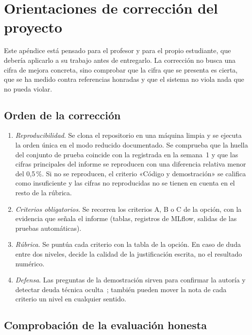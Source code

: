 \chapter{Orientaciones de corrección del proyecto}
\label{ap:correccion}

Este apéndice está pensado para el profesor y para el propio estudiante, que debería aplicarlo a su trabajo antes de entregarlo. La corrección no busca una cifra de mejora concreta, sino comprobar que la cifra que se presenta es cierta, que se ha medido contra referencias honradas y que el sistema no viola nada que no pueda violar.

\section{Orden de la corrección}

\begin{enumerate}[label=\arabic*.]
  \item \emph{Reproducibilidad}. Se clona el repositorio en una máquina limpia y se ejecuta la orden única en el modo reducido documentado. Se comprueba que la huella del conjunto de prueba coincide con la registrada en la semana~1 y que las cifras principales del informe se reproducen con una diferencia relativa menor del 0{,}5\,\%. Si no se reproducen, el criterio «Código y demostración» se califica como insuficiente y las cifras no reproducidas no se tienen en cuenta en el resto de la rúbrica.
  \item \emph{Criterios obligatorios}. Se recorren los criterios A, B o C de la opción, con la evidencia que señala el informe (tablas, registros de MLflow, salidas de las pruebas automáticas).
  \item \emph{Rúbrica}. Se puntúa cada criterio con la tabla de la opción. En caso de duda entre dos niveles, decide la calidad de la justificación escrita, no el resultado numérico.
  \item \emph{Defensa}. Las preguntas de la demostración sirven para confirmar la autoría y detectar deuda técnica oculta~\cite{sculley}; también pueden mover la nota de cada criterio un nivel en cualquier sentido.
\end{enumerate}

\section{Comprobación de la evaluación honesta}


